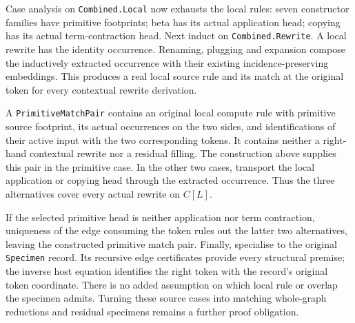 
Case analysis on \texttt{Combined.Local} now exhausts the local rules:
seven constructor families have primitive footprints; beta has its actual
application head; copying has its actual term-contraction head.
Next induct on \texttt{Combined.Rewrite}. A local rewrite has the identity
occurrence. Renaming, plugging and expansion compose the inductively
extracted occurrence with their existing incidence-preserving embeddings.
This produces a real local source rule and its match at the original token
for every contextual rewrite derivation.


A \texttt{PrimitiveMatchPair} contains an original local compute rule with
primitive source footprint, its actual occurrences on the two sides, and
identifications of their active input with the two corresponding tokens.
It contains neither a right-hand contextual rewrite nor a residual filling.
The construction above supplies this pair in the primitive case. In the
other two cases, transport the local application or copying head through
the extracted occurrence. Thus the three alternatives cover every actual
rewrite on $C[L]$.


If the selected primitive head is neither application nor term contraction,
uniqueness of the edge consuming the token rules out the latter two
alternatives, leaving the constructed primitive match pair. Finally,
specialise to the original \texttt{Specimen} record. Its recursive edge
certificates provide every structural premise; the inverse host equation
identifies the right token with the record's original token coordinate.
There is no added assumption on which local rule or overlap the specimen
admits. Turning these source cases into matching whole-graph reductions and
residual specimens remains a further proof obligation.

